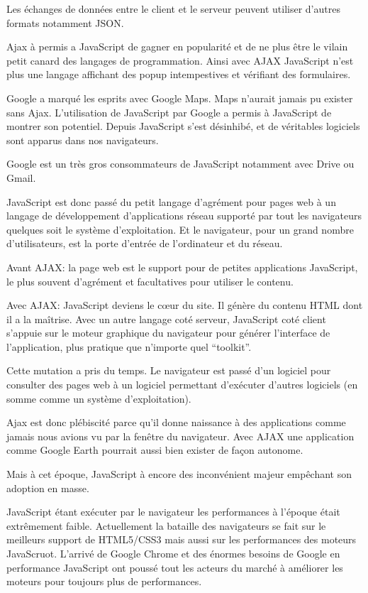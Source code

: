 Les échanges de données entre le client et le serveur peuvent utiliser d’autres formats notamment JSON.

Ajax à permis a JavaScript de gagner en popularité et de ne plus être le vilain petit canard des langages de programmation. Ainsi avec AJAX JavaScript n’est plus une langage affichant des popup intempestives et vérifiant des formulaires.

Google a marqué les esprits avec Google Maps. Maps n’aurait jamais pu exister sans Ajax. L’utilisation de JavaScript par Google a permis à JavaScript de montrer son potentiel. Depuis JavaScript s’est désinhibé, et de véritables logiciels sont apparus dans nos navigateurs.

Google est un très gros consommateurs de JavaScript notamment avec Drive ou Gmail.

JavaScript est donc passé du petit langage d’agrément pour pages web à  un langage de développement d’applications réseau supporté par tout les navigateurs quelques soit le système d’exploitation. Et le navigateur, pour un grand nombre d’utilisateurs, est la porte d’entrée de l’ordinateur et du réseau.

Avant AJAX: la page web est le support pour de petites applications JavaScript, le plus souvent d’agrément et facultatives pour utiliser le contenu.

Avec AJAX: JavaScript deviens le cœur du site. Il génère du contenu HTML dont il a la maîtrise. Avec un autre langage coté serveur, JavaScript coté client s’appuie sur le moteur graphique du navigateur pour générer l’interface de l’application, plus pratique que n’importe quel “toolkit”.

Cette mutation a pris du temps. Le navigateur est passé d’un logiciel pour consulter des pages web à un logiciel permettant d’exécuter d’autres logiciels (en somme comme un système d’exploitation).

Ajax est donc plébiscité parce qu’il donne naissance à des applications comme jamais nous avions vu par la fenêtre du navigateur. Avec AJAX une application comme Google Earth pourrait aussi bien exister de façon autonome.

Mais à cet époque, JavaScript à encore des inconvénient majeur empêchant son adoption en masse.

JavaScript étant exécuter par le navigateur les performances à l’époque était extrêmement faible. Actuellement la bataille des navigateurs se fait sur le meilleurs support de HTML5/CSS3 mais aussi sur les performances des moteurs JavaScruot. L’arrivé de Google Chrome et des énormes besoins de Google en performance JavaScript ont poussé tout les acteurs du marché à améliorer les moteurs pour toujours plus de performances.

